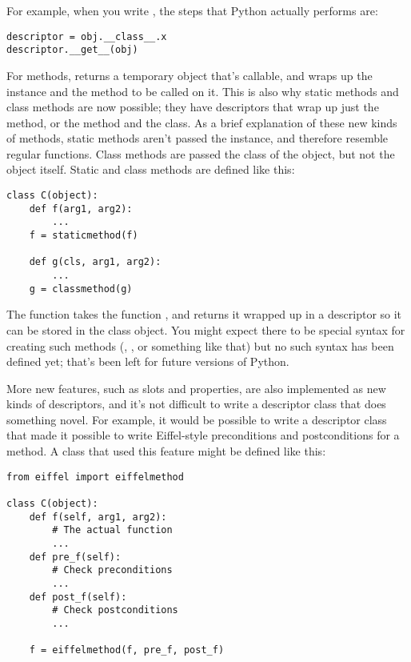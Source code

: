 \documentclass{howto}
\begin{document}
For example, when you write , the steps that Python
actually performs are:

\begin{verbatim}
descriptor = obj.__class__.x
descriptor.__get__(obj)
\end{verbatim}

For methods,  returns a temporary object that's
callable, and wraps up the instance and the method to be called on it.
This is also why static methods and class methods are now possible;
they have descriptors that wrap up just the method, or the method and
the class.  As a brief explanation of these new kinds of methods,
static methods aren't passed the instance, and therefore resemble
regular functions.  Class methods are passed the class of the object,
but not the object itself.  Static and class methods are defined like
this:

\begin{verbatim}
class C(object):
    def f(arg1, arg2):
        ...
    f = staticmethod(f)

    def g(cls, arg1, arg2):
        ...
    g = classmethod(g)
\end{verbatim}

The  function takes the function
, and returns it wrapped up in a descriptor so it can be
stored in the class object.  You might expect there to be special
syntax for creating such methods (,
, or something like that) but no such syntax has
been defined yet; that's been left for future versions of Python.

More new features, such as slots and properties, are also implemented
as new kinds of descriptors, and it's not difficult to write a
descriptor class that does something novel.  For example, it would be
possible to write a descriptor class that made it possible to write
Eiffel-style preconditions and postconditions for a method.  A class
that used this feature might be defined like this:

\begin{verbatim}
from eiffel import eiffelmethod

class C(object):
    def f(self, arg1, arg2):
        # The actual function
        ...
    def pre_f(self):
        # Check preconditions
        ...
    def post_f(self):
        # Check postconditions
        ...

    f = eiffelmethod(f, pre_f, post_f)
\end{verbatim}
\end{document}
